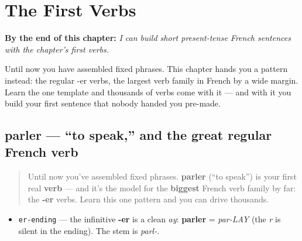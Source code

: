 
\chapter{The First Verbs}
\label{ch:first-verbs}

\begin{chapteropening}
\textbf{By the end of this chapter:} \emph{I can build short present-tense French sentences with the chapter's first verbs.}

Until now you have assembled fixed phrases. This chapter hands you a pattern instead: the regular -er verbs, the largest verb family in French by a wide margin. Learn the one template and thousands of verbs come with it — and with it you build your first sentence that nobody handed you pre-made.
\end{chapteropening}

\section[parler]{parler — \textquotedblleft{}to speak,\textquotedblright{} and the great regular French verb}

\label{lesson:FR-C05-parler}



\begin{quote}
Until now you've assembled fixed phrases. \textbf{parler} (\textquotedblleft{}to speak\textquotedblright{}) is your first real \textbf{verb} — and it's the model for the \textbf{biggest} French verb family by far: the \textbf{-er} verbs. Learn this one pattern and you can drive thousands.
\end{quote}

\begin{sounds}
\begin{itemize}
\raggedright
  \item \texttt{er-ending} — the infinitive \textbf{-er} is a clean \emph{ay}: \textbf{parler} = \emph{par-LAY} (the \emph{r} is silent in the ending). The stem is \emph{parl-}.
\end{itemize}
\end{sounds}


